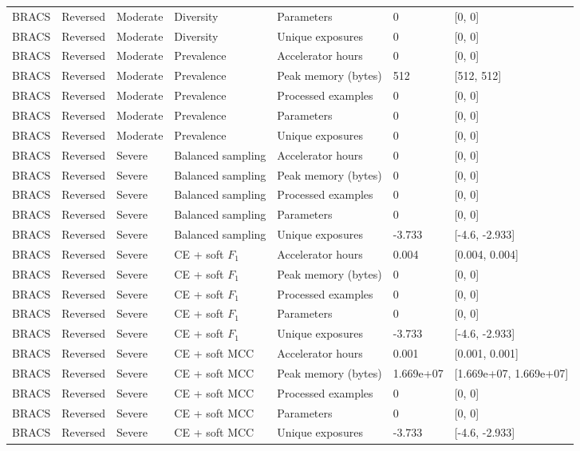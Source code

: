 \begin{longtable}{lllllll}
BRACS & Reversed & Moderate & Diversity & Parameters & 0 & [0, 0] \\
BRACS & Reversed & Moderate & Diversity & Unique exposures & 0 & [0, 0] \\
BRACS & Reversed & Moderate & Prevalence & Accelerator hours & 0 & [0, 0] \\
BRACS & Reversed & Moderate & Prevalence & Peak memory (bytes) & 512 & [512, 512] \\
BRACS & Reversed & Moderate & Prevalence & Processed examples & 0 & [0, 0] \\
BRACS & Reversed & Moderate & Prevalence & Parameters & 0 & [0, 0] \\
BRACS & Reversed & Moderate & Prevalence & Unique exposures & 0 & [0, 0] \\
BRACS & Reversed & Severe & Balanced sampling & Accelerator hours & 0 & [0, 0] \\
BRACS & Reversed & Severe & Balanced sampling & Peak memory (bytes) & 0 & [0, 0] \\
BRACS & Reversed & Severe & Balanced sampling & Processed examples & 0 & [0, 0] \\
BRACS & Reversed & Severe & Balanced sampling & Parameters & 0 & [0, 0] \\
BRACS & Reversed & Severe & Balanced sampling & Unique exposures & -3.733 & [-4.6, -2.933] \\
BRACS & Reversed & Severe & CE + soft $F_1$ & Accelerator hours & 0.004 & [0.004, 0.004] \\
BRACS & Reversed & Severe & CE + soft $F_1$ & Peak memory (bytes) & 0 & [0, 0] \\
BRACS & Reversed & Severe & CE + soft $F_1$ & Processed examples & 0 & [0, 0] \\
BRACS & Reversed & Severe & CE + soft $F_1$ & Parameters & 0 & [0, 0] \\
BRACS & Reversed & Severe & CE + soft $F_1$ & Unique exposures & -3.733 & [-4.6, -2.933] \\
BRACS & Reversed & Severe & CE + soft MCC & Accelerator hours & 0.001 & [0.001, 0.001] \\
BRACS & Reversed & Severe & CE + soft MCC & Peak memory (bytes) & 1.669e+07 & [1.669e+07, 1.669e+07] \\
BRACS & Reversed & Severe & CE + soft MCC & Processed examples & 0 & [0, 0] \\
BRACS & Reversed & Severe & CE + soft MCC & Parameters & 0 & [0, 0] \\
BRACS & Reversed & Severe & CE + soft MCC & Unique exposures & -3.733 & [-4.6, -2.933] \\

\end{longtable}

